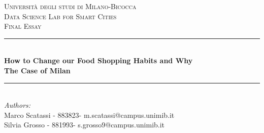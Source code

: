 \begin{titlepage}

\newcommand{\HRule}{\rule{\linewidth}{0.5mm}} %

\center %
 

\textsc{\LARGE Università degli studi di Milano-Bicocca}\\[1cm] %
\textsc{\Large Data Science Lab for Smart Cities}\\[0.3cm] %
\textsc{\large Final Essay}\\[0.1cm] %


\HRule \\[0.4cm]

{ \LARGE \bfseries How to Change our Food Shopping Habits and Why}\\[0.3cm] %

{ \Large \bfseries The Case of Milan}\\[0.1cm] %
\HRule \\[1.5cm]
 

\large
\emph{Authors:}\\
Marco Scatassi - 883823- m.scatassi@campus.unimib.it \\   %
Silvia Grosso - 881993- s.grosso9@campus.unimib.it   \\[1cm] %



\end{titlepage}
